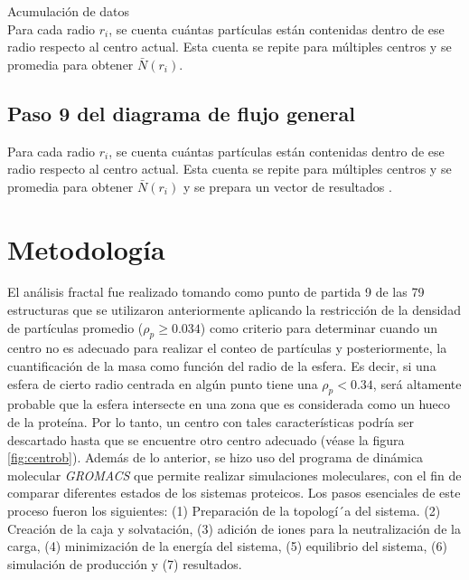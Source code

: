 	Acumulaci\'{o}n de datos\\
	Para cada radio \( r_i \), se cuenta cu\'{a}ntas part\'{i}culas est\'{a}n contenidas dentro de ese radio respecto al centro actual. Esta cuenta se repite para m\'{u}ltiples centros y se promedia para obtener \(\bar{N}(r_i)\).


	

 	
 	\subsection{Paso 9 del diagrama de flujo general}
 		

 	Para cada radio \( r_i \), se cuenta cu\'{a}ntas part\'{i}culas est\'{a}n contenidas dentro de ese radio respecto al centro actual. Esta cuenta se repite para m\'{u}ltiples centros y se promedia para obtener \( \bar{N}(r_i) \)	y se prepara un vector de resultados .
 
 	\section{Metodolog\'{i}a}
 	\label{met}
 	
 	El an\'{a}lisis fractal fue realizado tomando como punto de partida 9 de las 79 estructuras que se utilizaron anteriormente aplicando la restricci\'{o}n de la densidad de part\'{i}culas  promedio ($\rho_{p} \geq 0.034$) como criterio para determinar cuando un centro no es adecuado para realizar el conteo de part\'{i}culas y posteriormente, la cuantificaci\'{o}n de la masa como funci\'{o}n del radio de la esfera. Es decir, si una esfera de cierto radio centrada en alg\'{u}n punto tiene una $\rho_{p} < 0.34$, ser\'{a} altamente probable que la esfera intersecte en una zona que es considerada como un hueco de la prote\'{i}na. Por lo tanto, un centro con tales caracter\'{i}sticas podr\'{i}a ser descartado hasta que se encuentre otro centro adecuado (v\'{e}ase la figura \ref{fig:centrob}). Adem\'{a}s de lo anterior, se hizo uso del programa de din\'{a}mica molecular \textit{GROMACS}\cite{Lemkul2024, Abraham2015} que permite realizar simulaciones moleculares, con el fin de comparar diferentes estados de los sistemas proteicos. Los pasos esenciales de este proceso fueron los siguientes: (1) Preparaci\'{o}n de la topolog\'{i´}a del sistema. (2) Creaci\'{o}n de la caja y solvataci\'{o}n, (3) adici\'{o}n de iones para la neutralizaci\'{o}n de la carga, (4) minimizaci\'{o}n de la energ\'{i}a del sistema, (5) equilibrio del sistema, (6) simulaci\'{o}n de producci\'{o}n y (7) resultados.
 	
